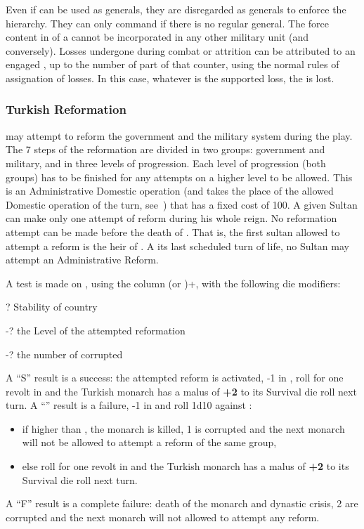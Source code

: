  Even if \Pashas can be used as generals,
they are disregarded as generals to enforce the hierarchy. They can only
command if there is no regular general.
\bparag The force content in \LD of a \Pasha cannot be incorporated in
any other military unit (and conversely).
\bparag Losses undergone during combat or attrition can be attributed to
an engaged \Pasha, up to the number of \LD part of that \Pasha counter,
using the normal rules of assignation of losses.  In this case, whatever
is the supported loss, the \Pasha is lost. %

\subsubsection{Turkish Reformation}
 \TUR may attempt to reform the
government and the military system during the play.  The 7 steps of the
reformation are divided in two groups: government and military, and in
three levels of progression. Each level of progression (both groups) has
to be finished for any attempts on a higher level to be allowed.
\bparag This is an Administrative Domestic operation (and takes the
place of the allowed Domestic operation of the turn,
see~) that has a fixed cost of
100\ducats.
\bparag A given Sultan can make only one attempt of reform during his
whole reign.
\bparag No reformation attempt can be made before the death of
. That is, the first sultan allowed to attempt a
reform is the heir of .
\bparag A its last scheduled turn of life, no Sultan may attempt an
Administrative Reform.

\aparag A test is made on ,
using the column (\MIL or \ADM)+, with the following die
modifiers:
\begin{modlist}
\item[\textpm?] Stability of country 
\item[-?] the Level of the attempted reformation
\item[-?]  the number of corrupted \Pashas
\end{modlist}
\bparag A ``S'' result is a success: the attempted reform is activated,
-1 in \STAB, roll for one revolt in \TUR and the Turkish monarch has a
malus of {\bf +2} to its Survival die roll next turn.
\bparag A ``\undemi'' result is a failure, -1 in \STAB and roll 1d10
against \FTI:
\begin{itemize}
\item if higher than \FTI, the monarch is killed, 1 \Pasha is corrupted
  and the next monarch will not be allowed to attempt a reform of the
  same group,
\item else roll for one revolt in \TUR and the Turkish monarch has a
  malus of {\bf +2} to its Survival die roll next turn.
\end{itemize}
\bparag A ``F'' result is a complete failure: death of the monarch and
dynastic crisis, 2 \Pashas are corrupted and the next monarch will not
allowed to attempt any reform.

